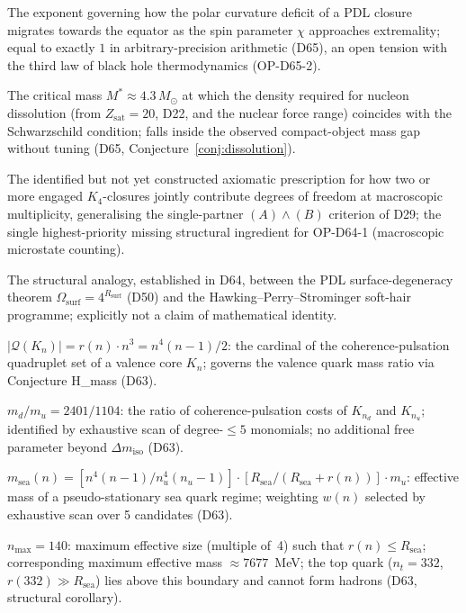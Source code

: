 \documentclass[11pt,a4paper]{article}
\theoremstyle{plain}
\theoremstyle{definition}
\theoremstyle{remark}
\newcommand{\Kfour}{K_4}
\newcommand{\Rsurf}{R_{\mathrm{surf}}}
\newcommand{\Zsat}{Z_{\mathrm{sat}}}
\begin{document}
\begin{description}[leftmargin=3.5cm, style=nextline]
\item[Curvature-migration exponent] The exponent governing how the polar curvature deficit of a PDL closure migrates towards the equator as the spin parameter $\chi$ approaches extremality; equal to exactly $1$ in arbitrary-precision arithmetic (D65), an open tension with the third law of black hole thermodynamics (OP-D65-2).
\item[Dissolution threshold $M^*$] The critical mass $M^*\approx4.3\,M_\odot$ at which the density required for nucleon dissolution (from $\Zsat=20$, D22, and the nuclear force range) coincides with the Schwarzschild condition; falls inside the observed compact-object mass gap without tuning (D65, Conjecture~\ref{conj:dissolution}).
\item[$K_4\leftrightarrow K_4$ coupling rule] The identified but not yet constructed axiomatic prescription for how two or more engaged $\Kfour$-closures jointly contribute degrees of freedom at macroscopic multiplicity, generalising the single-partner $(A)\wedge(B)$ criterion of D29; the single highest-priority missing structural ingredient for OP-D64-1 (macroscopic microstate counting).
\item[Soft-hair correspondence] The structural analogy, established in D64, between the PDL surface-degeneracy theorem $\Omega_{\mathrm{surf}}=4^{\Rsurf}$ (D50) and the Hawking--Perry--Strominger soft-hair programme; explicitly not a claim of mathematical identity.
\item[Coherence-pulsation cost] $|\mathcal{Q}(K_n)| = r(n)\cdot n^3 = n^4(n-1)/2$: the cardinal of the coherence-pulsation quadruplet set of a valence core $K_n$; governs the valence quark mass ratio via Conjecture H\_mass (D63).
\item[Conjecture H\_mass] $m_d/m_u = 2401/1104$: the ratio of coherence-pulsation costs of $K_{n_d}$ and $K_{n_u}$; identified by exhaustive scan of degree-$\leq 5$ monomials; no additional free parameter beyond $\Delta m_{\mathrm{iso}}$ (D63).
\item[Conjecture H\_sea] $m_{\mathrm{sea}}(n) = [n^4(n-1)/n_u^4(n_u-1)]\cdot[R_{\mathrm{sea}}/(R_{\mathrm{sea}}+r(n))]\cdot m_u$: effective mass of a pseudo-stationary sea quark regime; weighting $w(n)$ selected by exhaustive scan over 5 candidates (D63).
\item[Hadronisation boundary] $n_{\max} = 140$: maximum effective size (multiple of~4) such that $r(n) \leq R_{\mathrm{sea}}$; corresponding maximum effective mass $\approx 7677$~MeV; the top quark ($n_t = 332$, $r(332) \gg R_{\mathrm{sea}}$) lies above this boundary and cannot form hadrons (D63, structural corollary).

\end{description}
\end{document}
